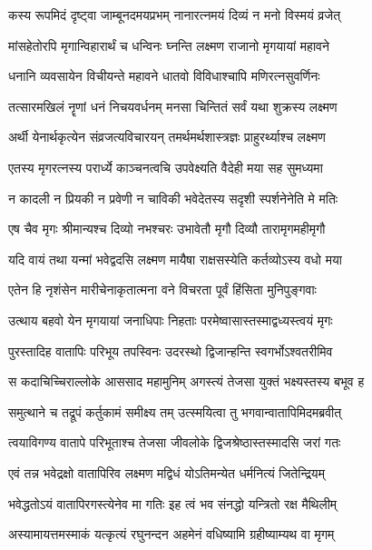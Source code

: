 \twolineshloka
{कस्य रूपमिदं दृष्ट्वा जाम्बूनदमयप्रभम्}
{नानारत्नमयं दिव्यं न मनो विस्मयं व्रजेत्} %

\twolineshloka
{मांसहेतोरपि मृगान्विहारार्थं च धन्विनः}
{घ्नन्ति लक्ष्मण राजानो मृगयायां महावने} %

\twolineshloka
{धनानि व्यवसायेन विचीयन्ते महावने}
{धातवो विविधाश्चापि मणिरत्नसुवर्णिनः} %

\twolineshloka
{तत्सारमखिलं नॄणां धनं निचयवर्धनम्}
{मनसा चिन्तितं सर्वं यथा शुक्रस्य लक्ष्मण} %

\twolineshloka
{अर्थी येनार्थकृत्येन संव्रजत्यविचारयन्}
{तमर्थमर्थशास्त्रज्ञः प्राहुरर्थ्याश्च लक्ष्मण} %

\twolineshloka
{एतस्य मृगरत्नस्य परार्ध्ये काञ्चनत्वचि}
{उपवेक्ष्यति वैदेही मया सह सुमध्यमा} %

\twolineshloka
{न कादली न प्रियकी न प्रवेणी न चाविकी}
{भवेदेतस्य सदृशी स्पर्शनेनेति मे मतिः} %

\twolineshloka
{एष चैव मृगः श्रीमान्यश्च दिव्यो नभश्चरः}
{उभावेतौ मृगौ दिव्यौ तारामृगमहीमृगौ} %

\twolineshloka
{यदि वायं तथा यन्मां भवेद्वदसि लक्ष्मण}
{मायैषा राक्षसस्येति कर्तव्योऽस्य वधो मया} %

\twolineshloka
{एतेन हि नृशंसेन मारीचेनाकृतात्मना}
{वने विचरता पूर्वं हिंसिता मुनिपुङ्गवाः} %

\twolineshloka
{उत्थाय बहवो येन मृगयायां जनाधिपाः}
{निहताः परमेष्वासास्तस्माद्वध्यस्त्वयं मृगः} %

\twolineshloka
{पुरस्तादिह वातापिः परिभूय तपस्विनः}
{उदरस्थो द्विजान्हन्ति स्वगर्भोऽश्वतरीमिव} %

\twolineshloka
{स कदाचिच्चिराल्लोके आससाद महामुनिम्}
{अगस्त्यं तेजसा युक्तं भक्ष्यस्तस्य बभूव ह} %

\twolineshloka
{समुत्थाने च तद्रूपं कर्तुकामं समीक्ष्य तम्}
{उत्स्मयित्वा तु भगवान्वातापिमिदमब्रवीत्} %

\twolineshloka
{त्वयाविगण्य वातापे परिभूताश्च तेजसा}
{जीवलोके द्विजश्रेष्ठास्तस्मादसि जरां गतः} %

\twolineshloka
{एवं तन्न भवेद्रक्षो वातापिरिव लक्ष्मण}
{मद्विधं योऽतिमन्येत धर्मनित्यं जितेन्द्रियम्} %

\twolineshloka
{भवेद्धतोऽयं वातापिरगस्त्येनेव मा गतिः}
{इह त्वं भव संनद्धो यन्त्रितो रक्ष मैथिलीम्} %

\twolineshloka
{अस्यामायत्तमस्माकं यत्कृत्यं रघुनन्दन}
{अहमेनं वधिष्यामि ग्रहीष्याम्यथ वा मृगम्} %

